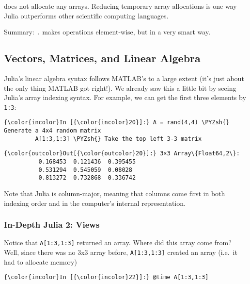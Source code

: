 \documentclass[11pt]{article}
\def\PYZsh{\char`\#}
\begin{document}
    does not allocate any arrays. Reducing temporary array allocations is
one way Julia outperforms other scientific computing languages.

Summary: \texttt{.} makes operations element-wise, but in a very smart
way.

    \subsection{Vectors, Matrices, and Linear
Algebra}\label{vectors-matrices-and-linear-algebra}

Julia's linear algebra syntax follows MATLAB's to a large extent (it's
just about the only thing MATLAB got right!). We already saw this a
little bit by seeing Julia's array indexing syntax. For example, we can
get the first three elements by \texttt{1:3}:

    \begin{Verbatim}[commandchars=\\\{\}]
{\color{incolor}In [{\color{incolor}20}]:} A = rand(4,4) \PYZsh{} Generate a 4x4 random matrix
         A[1:3,1:3] \PYZsh{} Take the top left 3-3 matrix
\end{Verbatim}

            \begin{Verbatim}[commandchars=\\\{\}]
{\color{outcolor}Out[{\color{outcolor}20}]:} 3×3 Array\{Float64,2\}:
          0.168453  0.121436  0.395455
          0.531294  0.545059  0.08028 
          0.813272  0.732868  0.336742
\end{Verbatim}
        
    Note that Julia is column-major, meaning that columns come first in both
indexing order and in the computer's internal representation.

    \subsubsection{In-Depth Julia 2: Views}\label{in-depth-julia-2-views}

Notice that \texttt{A{[}1:3,1:3{]}} returned an array. Where did this
array come from? Well, since there was no 3x3 array before,
\texttt{A{[}1:3,1:3{]}} created an array (i.e.~it had to allocate
memory)

    \begin{Verbatim}[commandchars=\\\{\}]
{\color{incolor}In [{\color{incolor}22}]:} @time A[1:3,1:3]
\end{Verbatim}
\end{document}
